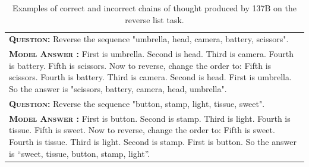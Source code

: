 \begingroup
\begin{table}[H]
    \centering
    \small
    \caption{
    Examples of correct and incorrect chains of thought produced by \lamda{} 137B on the reverse list task.
    }
    \begin{tabular}{p{\linewidth}}
        \toprule
        \vspace{-2mm}
        \textbf{\textsc{Question:}} Reverse the sequence "umbrella, head, camera, battery, scissors".  \\
        \vspace{-1mm}
        \textbf{\textsc{Model Answer \color{darkGreen}{(CORRECT)}:}} First is umbrella. Second is head. Third is camera. Fourth is battery. Fifth is scissors. Now to reverse, change the order to: Fifth is scissors. Fourth is battery. Third is camera. Second is head. First is umbrella. So the answer is "scissors, battery, camera, head, umbrella". \color{darkGreen}{\checkmark} \\
        \midrule
        \vspace{-2mm}
        \textbf{\textsc{Question:}} Reverse the sequence "button, stamp, light, tissue, sweet". \\
        \vspace{-1mm}
        \textbf{\textsc{Model Answer \color{blue}{(INCORRECT)}:}} First is button. Second is stamp. Third is light. Fourth is tissue. Fifth is sweet. Now to reverse, change the order to: Fifth is sweet. Fourth is tissue. Third is light. Second is stamp. First is button. So the answer is ``sweet, tissue, {\color{blue} button, stamp, light''}. \color{blue}{\xmark} \\
        \bottomrule
    \end{tabular}
    \label{tab:appendix-reverse-object-examples}
\end{table}
\endgroup